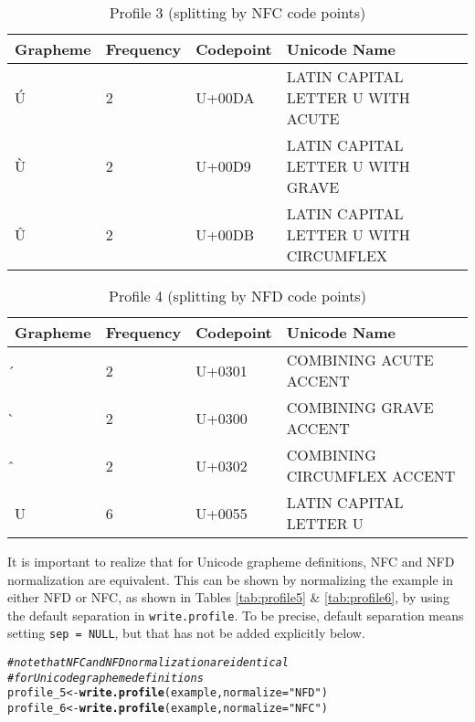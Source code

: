 \documentclass[output=book,nonflat,modfonts,
citecolor=brown,
		]{langsci/langscibook}\usepackage[]{graphicx}\usepackage[]{color}
\makeatletter
\newcommand{\hlstr}[1]{\textcolor[rgb]{0.192,0.494,0.8}{#1}}%
\newcommand{\hlcom}[1]{\textcolor[rgb]{0.678,0.584,0.686}{\textit{#1}}}%
\newcommand{\hlstd}[1]{\textcolor[rgb]{0.345,0.345,0.345}{#1}}%
\newcommand{\hlkwb}[1]{\textcolor[rgb]{0.69,0.353,0.396}{#1}}%
\newcommand{\hlkwc}[1]{\textcolor[rgb]{0.333,0.667,0.333}{#1}}%
\newcommand{\hlkwd}[1]{\textcolor[rgb]{0.737,0.353,0.396}{\textbf{#1}}}%
\newenvironment{kframe}{%
 \def\at@end@of@kframe{}%
 \ifinner\ifhmode%
  \def\at@end@of@kframe{\end{minipage}}%
  \begin{minipage}{\columnwidth}%
 \fi\fi%
 \def\FrameCommand##1{\hskip\@totalleftmargin \hskip-\fboxsep
 \colorbox{shadecolor}{##1}\hskip-\fboxsep
     \hskip-\linewidth \hskip-\@totalleftmargin \hskip\columnwidth}%
 \MakeFramed {\advance\hsize-\width
   \@totalleftmargin\z@ \linewidth\hsize
   \@setminipage}}%
 {\par\unskip\endMakeFramed%
 \at@end@of@kframe}
\newenvironment{knitrout}{}{} %
\makeatother
\begin{document}
\begin{table}[H]
\centering
\begingroup\scriptsize
\begin{tabular}{llll}
  \toprule
Grapheme & Frequency & Codepoint & Unicode Name \\ 
  \midrule
Ú & 2 & U+00DA & LATIN CAPITAL LETTER U WITH ACUTE \\ 
  Ù & 2 & U+00D9 & LATIN CAPITAL LETTER U WITH GRAVE \\ 
  Û & 2 & U+00DB & LATIN CAPITAL LETTER U WITH CIRCUMFLEX \\ 
   \bottomrule
\end{tabular}
\endgroup
\caption{Profile 3 (splitting by NFC code points)} 
\label{tab:profile3}
\end{table}


\begin{table}[H]
\centering
\begingroup\scriptsize
\begin{tabular}{llll}
  \toprule
Grapheme & Frequency & Codepoint & Unicode Name \\ 
  \midrule
́ & 2 & U+0301 & COMBINING ACUTE ACCENT \\ 
  ̀ & 2 & U+0300 & COMBINING GRAVE ACCENT \\ 
  ̂ & 2 & U+0302 & COMBINING CIRCUMFLEX ACCENT \\ 
  U & 6 & U+0055 & LATIN CAPITAL LETTER U \\ 
   \bottomrule
\end{tabular}
\endgroup
\caption{Profile 4 (splitting by NFD code points)} 
\label{tab:profile4}
\end{table}


It is important to realize that for Unicode grapheme definitions, NFC
and NFD normalization are equivalent. This can be shown by normalizing the
example in either NFD or NFC, as shown in Tables \ref{tab:profile5} \& \ref{tab:profile6}, 
by using the default separation in
\texttt{write.profile}. To be precise, default separation means setting
\texttt{sep~=~NULL}, but that has not be added explicitly below.

\begin{knitrout}\footnotesize
{}\color{fgcolor}\begin{kframe}
\begin{alltt}
\hlcom{# note that NFC and NFD normalization are identical}
\hlcom{# for Unicode grapheme definitions}
\hlstd{profile_5} \hlkwb{<-} \hlkwd{write.profile}\hlstd{(example,} \hlkwc{normalize} \hlstd{=} \hlstr{"NFD"}\hlstd{)}
\hlstd{profile_6} \hlkwb{<-} \hlkwd{write.profile}\hlstd{(example,} \hlkwc{normalize} \hlstd{=} \hlstr{"NFC"}\hlstd{)}
\end{alltt}
\end{kframe}
\end{knitrout}
\end{document}
